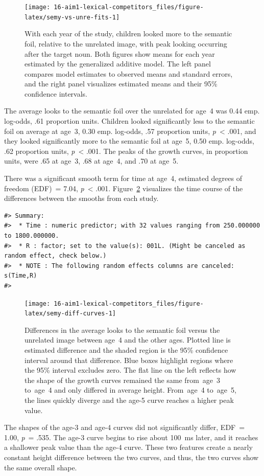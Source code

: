 \documentclass [11pt, proquest] {uwthesis}[2015/03/03]
\begin{document}
\begin{figure}
\texttt{[image: 16-aim1-lexical-competitors\_files/figure-latex/semy-vs-unre-fits-1]} \caption{With each year of the study, children looked
more to the semantic foil, relative to the unrelated image, with peak
looking occurring after the target noun. Both figures show means for
each year estimated by the generalized additive model. The left panel
compares model estimates to observed means and standard errors, and the
right panel visualizes estimated means and their 95\% confidence
intervals.}\label{fig:semy-vs-unre-fits}
\end{figure}
The average looks to the semantic foil over the unrelated for age~4 was
0.44 emp. log-odds, .61 proportion units. Children looked significantly
less to the semantic foil on average at age~3, 0.30 emp. log-odds, .57
proportion units, \emph{p}~\textless{} .001, and they looked
significantly more to the semantic foil at age~5, 0.50 emp. log-odds,
.62 proportion units, \emph{p}~\textless{} .001. The peaks of the growth
curves, in proportion units, were .65 at age~3, .68 at age~4, and .70 at
age~5.

There was a significant smooth term for time at age~4, estimated degrees
of freedom (EDF)~= 7.04, \emph{p}~\textless{} .001.
Figure~\ref{fig:semy-diff-curves} visualizes the time course of the
differences between the smooths from each study.









\begin{verbatim}
#> Summary:
#>  * Time : numeric predictor; with 32 values ranging from 250.000000 to 1800.000000. 
#>  * R : factor; set to the value(s): 001L. (Might be canceled as random effect, check below.) 
#>  * NOTE : The following random effects columns are canceled: s(Time,R)
#> 
\end{verbatim}
\begin{figure}
\texttt{[image: 16-aim1-lexical-competitors\_files/figure-latex/semy-diff-curves-1]} \caption{Differences in the average looks to the semantic
foil versus the unrelated image between age~4 and the other ages.
Plotted line is estimated difference and the shaded region is the 95\%
confidence interval around that difference. Blue boxes highlight regions
where the 95\% interval excludes zero. The flat line on the left
reflects how the shape of the growth curves remained the same from~age~3
to~age~4 and only differed in average height. From~age~4 to~age~5, the
lines quickly diverge and the age-5 curve reaches a higher peak value.}\label{fig:semy-diff-curves}
\end{figure}
The shapes of the age-3 and age-4 curves did not significantly differ,
EDF~= 1.00, \emph{p}~= .535. The age-3 curve begins to rise about 100~ms
later, and it reaches a shallower peak value than the age-4 curve. These
two features create a nearly constant height difference between the two
curves, and thus, the two curves show the same overall shape.
\end{document}

